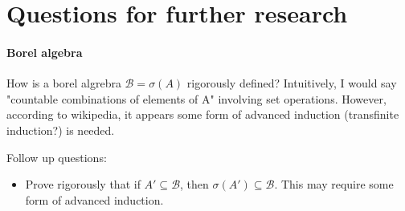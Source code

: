 \documentclass[a4paper]{article}
\newcommand{\borel}[0]{\mathcal{B}} %
\begin{document}
\section*{Questions for further research}
\paragraph{Borel algebra} How is a borel algrebra $\borel = \sigma(A)$ rigorously defined? Intuitively, I would say "countable combinations of elements of A" involving set operations. However, according to wikipedia, it appears some form of advanced induction (transfinite induction?) is needed.

Follow up questions:
\begin{itemize}
	\item Prove rigorously that if $A'\subseteq \borel$, then $\sigma(A')\subseteq \borel$. This may require some form of advanced induction.
\end{itemize}
\end{document}
